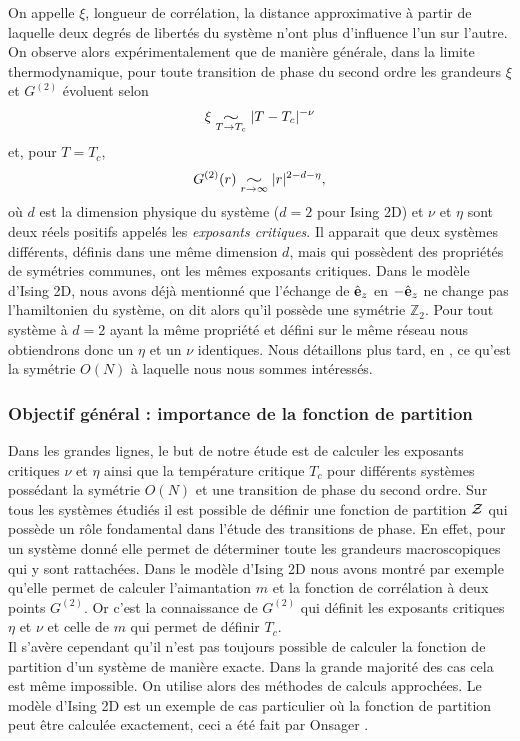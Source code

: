 \documentclass[10.5pt]{article}
\newcommand{\widesim}[2][1.5]{
  \mathrel{\underset{#2}{\scalebox{#1}[1]{$\sim$}}}
  }
\begin{document}
\begin{multicols*}{2}
On appelle $\xi$, longueur de corrélation, la distance approximative à partir de laquelle deux degrés de libertés du système n'ont plus d'influence l'un sur l'autre. On observe alors expérimentalement que de manière générale, dans la limite thermodynamique, pour toute transition de phase du second ordre les grandeurs $\xi$ et $G^{(2)}$ évoluent selon 
\begin{equation}
	\xi \widesim{T \to T_c} |T-T_c|^{-\nu}
\end{equation}
et, pour $T = T_c$,
\begin{equation}
	 G^{(2)}(r) \widesim{r \to \infty} |r|^{2-d-\eta},
\end{equation}
où $d$ est la dimension physique du système ($d=2$ pour Ising 2D) et $\nu$ et $\eta$ sont deux réels positifs appelés les \emph{exposants critiques}.  Il apparait que deux systèmes différents, définis dans une même dimension $d$, mais qui possèdent des propriétés de symétries communes, ont les mêmes exposants critiques. Dans le modèle d'Ising 2D, nous avons déjà mentionné que l'échange de $\hat{\mathbf{e}}_z$ en $-\hat{\mathbf{e}}_z$ ne change pas l'hamiltonien du système, on dit alors qu'il possède une symétrie $\mathbb{Z}_2$. Pour tout système à $d=2$ ayant la même propriété et défini sur le même réseau nous obtiendrons donc un $\eta$ et un $\nu$ identiques. Nous détaillons plus tard, en , ce qu'est la symétrie $O(N)$  à laquelle nous nous sommes intéressés. \\


\subsubsection{Objectif général : importance de la fonction de partition}

Dans les grandes lignes, le but de notre étude est de calculer les exposants critiques $\nu$ et $\eta$ ainsi que la température critique $T_c$ pour différents systèmes possédant la symétrie $O(N)$ et une transition de phase du second ordre. Sur tous les systèmes étudiés il est possible de définir une fonction de partition $\mathcal{Z}$ qui possède un rôle fondamental dans l'étude des transitions de phase. En effet, pour un système donné elle permet de déterminer toute les grandeurs macroscopiques qui y sont rattachées. Dans le modèle d'Ising 2D nous avons montré par exemple qu'elle permet de calculer l'aimantation $m$ et la fonction de corrélation à deux points $G^{(2)}$. Or c'est la connaissance de $G^{(2)}$ qui définit les exposants critiques $\eta$ et $\nu$ et celle de $m$ qui permet de définir $T_c$.\\
\indent
Il s'avère cependant qu'il n'est pas toujours possible de calculer la fonction de partition d'un système de manière exacte. Dans la grande majorité des cas cela est même impossible. On utilise alors des méthodes de calculs approchées. Le modèle d'Ising 2D est un exemple de cas particulier où la fonction de partition peut être calculée exactement, ceci a été fait par Onsager \cite{Onsager}. \\


\end{multicols*}
\end{document}
